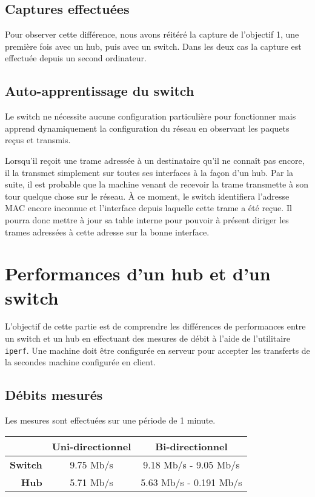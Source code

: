 \documentclass[11pt,a4paper]{article}
\begin{document}
\subsection{Captures effectuées}

Pour observer cette différence, nous avons réitéré la capture de l'objectif 1, une première fois avec un hub, puis avec un switch. Dans les deux cas la capture est effectuée depuis un second ordinateur.

\subsection{Auto-apprentissage du switch}

Le switch ne nécessite aucune configuration particulière pour fonctionner mais apprend dynamiquement la configuration du réseau en observant les paquets reçus et transmis.

Lorsqu'il reçoit une trame adressée à un destinataire qu'il ne connaît pas encore, il la transmet simplement sur toutes ses interfaces à la façon d'un hub. Par la suite, il est probable que la machine venant de recevoir la trame transmette à son tour quelque chose sur le réseau. À ce moment, le switch identifiera l'adresse MAC encore inconnue et l'interface depuis laquelle cette trame a été reçue. Il pourra donc mettre à jour sa table interne pour pouvoir à présent diriger les trames adressées à cette adresse sur la bonne interface.

\section{Performances d'un hub et d'un switch}

L'objectif de cette partie est de comprendre les différences de performances entre un switch et un hub en effectuant des mesures de débit à l'aide de l'utilitaire \texttt{iperf}. Une machine doit être configurée en serveur pour accepter les transferts de la secondes machine configurée en client.

\subsection{Débits mesurés}

Les mesures sont effectuées sur une période de 1 minute.

\begin{tabular}{|r|c|c|}
	\hline
	& \textbf{Uni-directionnel} & \textbf{Bi-directionnel} \\
	\hline
	\textbf{Switch} & 9.75 Mb/s & 9.18 Mb/s - 9.05 Mb/s \\
	\textbf{Hub} & 5.71 Mb/s & 5.63 Mb/s - 0.191  Mb/s \\
	\hline
\end{tabular}
\end{document}
